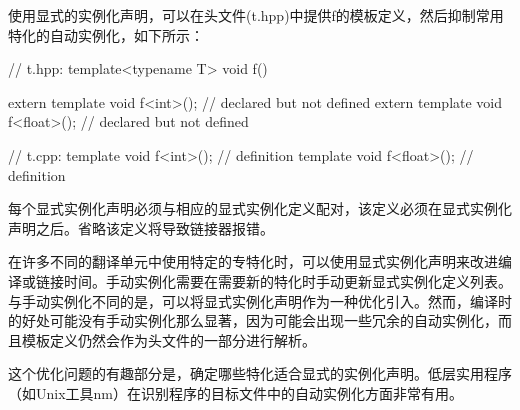 使用显式的实例化声明，可以在头文件(t.hpp)中提供f的模板定义，然后抑制常用特化的自动实例化，如下所示：

\begin{cpp}
// t.hpp:
template<typename T> void f() { }

extern template void f<int>(); // declared but not defined
extern template void f<float>(); // declared but not defined

// t.cpp:
template void f<int>(); // definition
template void f<float>(); // definition
\end{cpp}

每个显式实例化声明必须与相应的显式实例化定义配对，该定义必须在显式实例化声明之后。省略该定义将导致链接器报错。

在许多不同的翻译单元中使用特定的专特化时，可以使用显式实例化声明来改进编译或链接时间。手动实例化需要在需要新的特化时手动更新显式实例化定义列表。与手动实例化不同的是，可以将显式实例化声明作为一种优化引入。然而，编译时的好处可能没有手动实例化那么显著，因为可能会出现一些冗余的自动实例化，而且模板定义仍然会作为头文件的一部分进行解析。

\begin{notice}
这个优化问题的有趣部分是，确定哪些特化适合显式的实例化声明。低层实用程序（如Unix工具nm）在识别程序的目标文件中的自动实例化方面非常有用。
\end{notice}


















